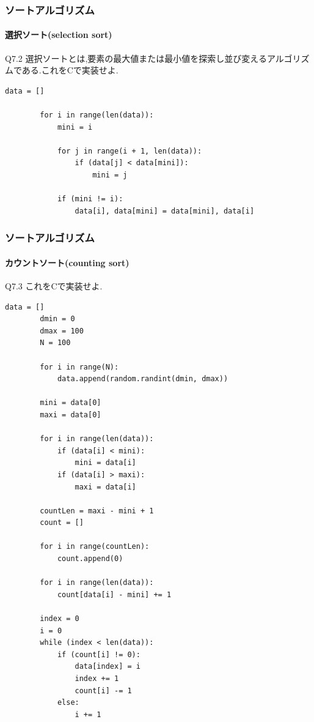 \documentclass[dvipdfmx]{beamer}
\begin{document}
\begin{frame}[t, fragile]
    \frametitle{ソートアルゴリズム}
    \framesubtitle{選択ソート(selection sort)}
    \begin{itembox}[l]{Q7.2}
        選択ソートとは,要素の最大値または最小値を探索し並び変えるアルゴリズムである.これをCで実装せよ.
    \end{itembox}
    \begin{lstlisting}[gobble=8, caption=selectionSort.py, label=selectionSort]
        data = []

        for i in range(len(data)):
            mini = i

            for j in range(i + 1, len(data)):
                if (data[j] < data[mini]):
                    mini = j

            if (mini != i):
                data[i], data[mini] = data[mini], data[i]
    \end{lstlisting}
\end{frame}

\begin{frame}
    \frametitle{ソートアルゴリズム}
    \framesubtitle{カウントソート(counting sort)}
    \begin{itembox}[l]{Q7.3}
        これをCで実装せよ.
    \end{itembox}
    \begin{lstlisting}[gobble=8, caption=countingSort.py, label=countingSort]
        data = []
        dmin = 0
        dmax = 100
        N = 100

        for i in range(N):
            data.append(random.randint(dmin, dmax))

        mini = data[0]
        maxi = data[0]

        for i in range(len(data)):
            if (data[i] < mini):
                mini = data[i]
            if (data[i] > maxi):
                maxi = data[i]

        countLen = maxi - mini + 1
        count = []

        for i in range(countLen):
            count.append(0)

        for i in range(len(data)):
            count[data[i] - mini] += 1

        index = 0
        i = 0
        while (index < len(data)):
            if (count[i] != 0):
                data[index] = i
                index += 1
                count[i] -= 1
            else:
                i += 1
    \end{lstlisting}
\end{frame}
\end{document}
